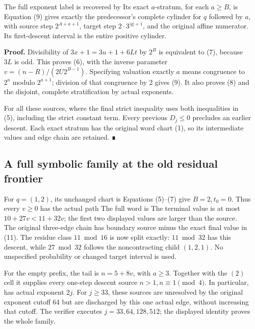 The full exponent label is recovered by
 Its exact
\(a\)-stratum, for each \(a\ge B\), is
Equation (9) gives exactly the predecessor's complete cylinder for \(q\)
followed by \(a\), with source step \(2^{A+a+1}\), target step
\(2\cdot3^{|q|+1}\), and the original affine numerator. Its
first-descent interval is the entire positive cylinder.

\textbf{Proof.} Divisibility of \(3x+1=3u+1+6Lt\) by \(2^B\) is
equivalent to (7), because \(3L\) is odd. This proves (6), with the
inverse parameter \(v=(n-R)/(2U2^{B-1})\). Specifying valuation exactly
\(a\) means congruence to \(2^a\) modulo \(2^{a+1}\); division of that
congruence by 2 gives (9). It also proves (8) and the disjoint, complete
stratification by actual exponents.

For all these sources,  where the final strict inequality
uses both inequalities in (5), including the strict constant term. Every
previous \(D_j\le0\) precludes an earlier descent. Each exact stratum
has the original word chart (1), so its intermediate values and edge
chain are retained. ∎

\subsection{A full symbolic family at the old residual frontier}

For \(q=(1,2)\), its unchanged chart is
 Equations (5)--(7) give
\(B=2,t_0=0\). Thus every \(v\ge0\) has the actual path
 The full word is
 The terminal value is at most
\(10+27v<11+32v\); the first two displayed values are larger than the
source. The original three-edge chain has boundary source minus the
exact final value in (11). The residue class \(11\bmod16\) is now split
exactly: \(11\bmod32\) has this descent, while \(27\bmod32\) follows the
noncontracting child \((1,2,1)\). No unspecified probability or changed
target interval is used.

For the empty prefix, the tail is \(n=5+8v\), with \(a\ge3\). Together
with the \((2)\) cell it supplies every one-step descent source
\(n>1,n\equiv1\pmod4\). In particular,
 has actual
exponent \(2j\). For \(j\ge33\), these sources are unresolved by the
original exponent cutoff 64 but are discharged by this one actual edge,
without increasing that cutoff. The verifier executes
\(j=33,64,128,512\); the displayed identity proves the whole family.

